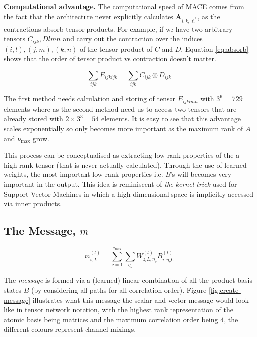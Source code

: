 \textbf{Computational advantage. } The computational speed of MACE comes from the fact that the architecture never explicitly calculates $\mathbf{A}_{i,k,\vec{\ell_3}}$, as the contractions absorb tensor products. For example, if we have two arbitrary tensors $C_{ijk}, D{lmn}$ and carry out the contraction over the indices $(i,l), (j,m), (k,n)$ of the tensor product of $C$ and $D$. Equation \ref{eq:absorb} shows that the order of tensor product vs contraction doesn't matter. 

\begin{equation} \label{eq:absorb}
    \sum_{ijk} E_{ijkijk} = \sum_{ijk} C_{ijk} \otimes D_{ijk}
\end{equation}

The first method needs calculation and storing of tensor $E_{ijklmn}$ with $3^6 = 729$ elements where as the second method need us to access two tensors that are already stored with $2 \times 3^3  = 54$ elements. It is easy to see that this advantage scales exponentially so only becomes more important as the maximum rank of $A$ and $\nu_\text{max}$ grow. 


This process can be conceptualised as extracting low-rank properties of the a high rank tensor (that is never actually calculated). Through the use of learned weights, the most important low-rank properties i.e. $B$'s will becomes very important in the output. This idea is reminiscent of \textit{the kernel trick} used for Support Vector Machines in which a high-dimensional space is implicitly accessed via inner products.

\subsection{The Message, $m$} 

\begin{equation} \label{eq:message}
    m_{i,L}^{(t)} =  \sum^{\nu_\text{max}}_{\nu=1} \sum_{\eta_{\nu}} W_{z_{i} L, \eta_{\nu}}^{(t)} B^{(t)}_{i,\eta_\nu L}
\end{equation}

The \textit{message} is formed via a (learned) linear combination of all the product basis states $B$ (by considering all paths for all correlation order). Figure \ref{fig:create-message} illustrates what this message the scalar and vector message would look like in tensor network notation, with the highest rank representation of the atomic basis being matrices and the maximum correlation order being $4$, the different colours represent channel mixings. 

